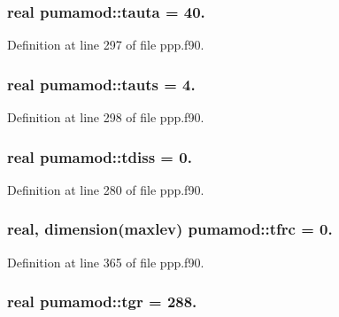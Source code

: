 \hypertarget{classpumamod_a2ff5f72c2ec1bb2f7a1931932165c297}{
\subsubsection[{tauta}]{\setlength{\rightskip}{0pt plus 5cm}real {\bf pumamod\-::tauta} = 40.}}
\label{classpumamod_a2ff5f72c2ec1bb2f7a1931932165c297}


\-Definition at line 297 of file ppp.\-f90.

\hypertarget{classpumamod_a3e769cf019402107f3c6e96b8740cf35}{
\subsubsection[{tauts}]{\setlength{\rightskip}{0pt plus 5cm}real {\bf pumamod\-::tauts} = 4.}}
\label{classpumamod_a3e769cf019402107f3c6e96b8740cf35}


\-Definition at line 298 of file ppp.\-f90.

\hypertarget{classpumamod_a3c92fd62d271fb04326fc32013d8c199}{
\subsubsection[{tdiss}]{\setlength{\rightskip}{0pt plus 5cm}real {\bf pumamod\-::tdiss} = 0.}}
\label{classpumamod_a3c92fd62d271fb04326fc32013d8c199}


\-Definition at line 280 of file ppp.\-f90.

\hypertarget{classpumamod_ac25246ebd045c4eba43e3cf8d1d7596e}{
\subsubsection[{tfrc}]{\setlength{\rightskip}{0pt plus 5cm}real, dimension(maxlev) {\bf pumamod\-::tfrc} = 0.}}
\label{classpumamod_ac25246ebd045c4eba43e3cf8d1d7596e}


\-Definition at line 365 of file ppp.\-f90.

\hypertarget{classpumamod_a65df7e27542e483c7082758755d1f328}{
\subsubsection[{tgr}]{\setlength{\rightskip}{0pt plus 5cm}real {\bf pumamod\-::tgr} = 288.}}
\label{classpumamod_a65df7e27542e483c7082758755d1f328}


